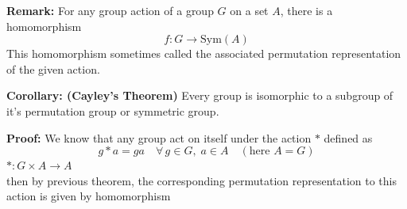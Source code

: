 \documentclass[11pt]{article}
\begin{document}
\bigskip
\noindent \textbf{Remark:} For any group action of a group $G$ on a set $A$, there is a homomorphism
\[
f : G \longrightarrow \text{Sym}(A)
\]
This homomorphism sometimes called the associated permutation representation of the given action.

\bigskip
\noindent \textbf{Corollary: (Cayley's Theorem)} Every group is isomorphic to a subgroup of it's permutation group or symmetric group.

\medskip
\noindent \textbf{Proof:} We know that any group act on itself under the action $*$ defined as
\[
g * a = ga \quad \forall\, g \in G, \; a \in A \quad (\text{here } A = G)
\]
$* : G \times A \to A$ \\
then by previous theorem, the corresponding permutation representation to this action is given by homomorphism
\end{document}
